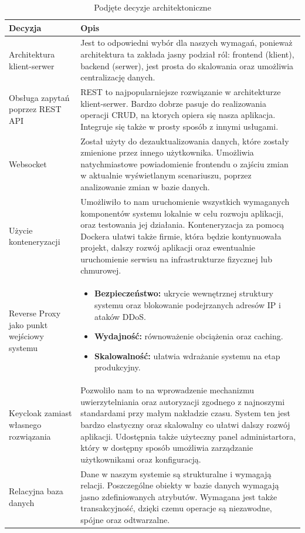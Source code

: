 \begin{table}[H]
    \centering
    \begin{tabular}{|p{4cm}|p{10cm}|}
        \hline
        \textbf{Decyzja} & \textbf{Opis} \\
        \hline
        Architektura klient-serwer & Jest to odpowiedni wybór dla naszych wymagań, ponieważ architektura ta 
        zakłada jasny podział ról: frontend (klient), backend (serwer), jest prosta do skalowania oraz umożliwia centralizację danych.  \\
        \hline
        Obsługa zapytań poprzez REST API & REST to najpopularniejsze rozwiązanie w architekturze klient-serwer. Bardzo dobrze pasuje
        do realizowania operacji CRUD, na ktorych opiera się nasza aplikacja. Integruje się także w prosty sposób z innymi usługami. \\
        \hline
        Websocket & Został użyty do dezauktualizowania danych, które zostały zmienione przez innego użytkownika. Umożliwia natychmiastowe
        powiadomienie frontendu o zajściu zmian w aktualnie wyświetlanym scenariuszu, poprzez analizowanie zmian w bazie danych. \\
        \hline 
        Użycie konteneryzacji &  Umożliwiło to nam uruchomienie wszystkich wymaganych komponentów systemu lokalnie w celu rozwoju aplikacji,
        oraz testowania jej działania. Konteneryzacja za pomocą Dockera ułatwi także firmie, która będzie kontynuowała projekt, dalszy
        rozwój aplikacji oraz ewentualnie uruchomienie serwisu na infrastrukturze fizycznej lub chmurowej. \\
        \hline
        Reverse Proxy jako punkt wejściowy systemu & 
        \begin{itemize}
            \setlength\itemsep{0.1em} 
            \item \textbf{Bezpieczeństwo:} ukrycie wewnętrznej struktury systemu oraz blokowanie podejrzanych adresów IP i ataków DDoS.
            \item \textbf{Wydajność:} równoważenie obciążenia oraz caching.
            \item \textbf{Skalowalność:} ułatwia wdrażanie systemu na etap produkcyjny.
        \end{itemize} \\
        \hline
        Keycloak zamiast własnego rozwiązania & Pozwoliło nam to na wprowadzenie mechanizmu 
        uwierzytelniania oraz autoryzacji zgodnego z najnoszymi standardami przy małym nakładzie czasu. System ten jest bardzo 
        elastyczny oraz skalowalny co ułatwi dalszy rozwój aplikacji. Udostępnia także użyteczny panel administartora, który w dostępny sposób
        umożliwia zarządzanie użytkownikami oraz konfiguracją. \\
        \hline
        Relacyjna baza danych & Dane w naszym systemie są strukturalne i wymagają relacji. Poszczególne obiekty w bazie danych wymagają
        jasno zdefiniowanych atrybutów. Wymagana jest także transakcyjność, dzięki czemu operacje są niezawodne, spójne oraz odtwarzalne.  \\
        \hline
    \end{tabular}
    \caption{Podjęte decyzje architektoniczne}
\end{table}

